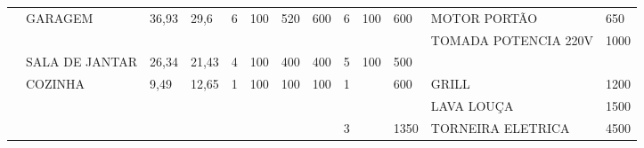 \begin{table}[H]
{\begin{tabular}{|l|l|ll|llll|lll|ll|}
		& \multirow{2}{*}{GARAGEM}     & \multicolumn{1}{l|}{\multirow{2}{*}{36,93}} & \multirow{2}{*}{29,6}  & \multicolumn{1}{l|}{\multirow{2}{*}{6}} & \multicolumn{1}{l|}{\multirow{2}{*}{100}} & \multicolumn{1}{l|}{\multirow{2}{*}{520}} & \multirow{2}{*}{600} & \multicolumn{1}{l|}{\multirow{2}{*}{6}} & \multicolumn{1}{l|}{\multirow{2}{*}{100}} & \multirow{2}{*}{600}  & \multicolumn{1}{l|}{MOTOR PORTÃO}         & 650      \\ \cline{12-13} 
		&                              & \multicolumn{1}{l|}{}                       &                        & \multicolumn{1}{l|}{}                   & \multicolumn{1}{l|}{}                     & \multicolumn{1}{l|}{}                     &                      & \multicolumn{1}{l|}{}                   & \multicolumn{1}{l|}{}                     &                       & \multicolumn{1}{l|}{TOMADA POTENCIA 220V} & 1000     \\ \cline{2-13} 
		& SALA DE JANTAR               & \multicolumn{1}{l|}{26,34}                  & 21,43                  & \multicolumn{1}{l|}{4}                  & \multicolumn{1}{l|}{100}                  & \multicolumn{1}{l|}{400}                  & 400                  & \multicolumn{1}{l|}{5}                  & \multicolumn{1}{l|}{100}                  & 500                   & \multicolumn{1}{l|}{}                     &          \\ \cline{2-13} 
		& \multirow{5}{*}{COZINHA}     & \multicolumn{1}{l|}{\multirow{5}{*}{9,49}}  & \multirow{5}{*}{12,65} & \multicolumn{1}{l|}{\multirow{5}{*}{1}} & \multicolumn{1}{l|}{\multirow{5}{*}{100}} & \multicolumn{1}{l|}{\multirow{5}{*}{100}} & \multirow{5}{*}{100} & \multicolumn{1}{l|}{\multirow{2}{*}{1}} & \multicolumn{1}{l|}{\multirow{2}{*}{}}    & \multirow{2}{*}{600}  & \multicolumn{1}{l|}{GRILL}                & 1200     \\ \cline{12-13} 
		&                              & \multicolumn{1}{l|}{}                       &                        & \multicolumn{1}{l|}{}                   & \multicolumn{1}{l|}{}                     & \multicolumn{1}{l|}{}                     &                      & \multicolumn{1}{l|}{}                   & \multicolumn{1}{l|}{}                     &                       & \multicolumn{1}{l|}{LAVA LOUÇA}           & 1500     \\ \cline{9-13} 
		&                              & \multicolumn{1}{l|}{}                       &                        & \multicolumn{1}{l|}{}                   & \multicolumn{1}{l|}{}                     & \multicolumn{1}{l|}{}                     &                      & \multicolumn{1}{l|}{\multirow{3}{*}{3}} & \multicolumn{1}{l|}{\multirow{3}{*}{}}    & \multirow{3}{*}{1350} & \multicolumn{1}{l|}{TORNEIRA ELETRICA}    & 4500     \\ \cline{12-13} 

\end{tabular}}
\end{table}
